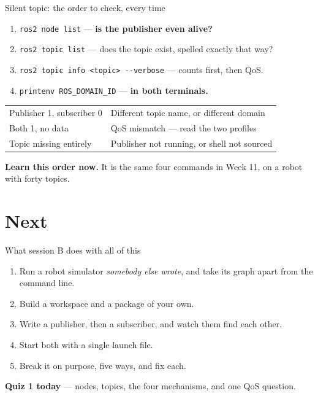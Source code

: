 \documentclass[aspectratio=169]{beamer}
\begin{document}
\begin{frame}{Silent topic: the order to check, every time}
  \small
  \begin{enumerate}
    \item \texttt{ros2 node list} --- \textbf{is the publisher even alive?}
    \item \texttt{ros2 topic list} --- does the topic exist, spelled exactly that way?
    \item \texttt{ros2 topic info <topic> -{}-verbose} --- counts first, then QoS.
    \item \texttt{printenv ROS\_DOMAIN\_ID} --- \textbf{in both terminals.}
  \end{enumerate}

  \vspace{0.7em}
  \begin{center}\footnotesize
  \begin{tabular}{@{}p{4.8cm}p{6.0cm}@{}}
    \toprule
    Publisher 1, subscriber 0 & Different topic name, or different domain \\
    Both 1, no data & QoS mismatch --- read the two profiles \\
    Topic missing entirely & Publisher not running, or shell not sourced \\
    \bottomrule
  \end{tabular}
  \end{center}

  \vspace{0.4em}
  \centering\footnotesize
  \textbf{Learn this order now.} It is the same four commands in Week 11, on a robot with
  forty topics.
\end{frame}

\section{Next}

\begin{frame}{What session B does with all of this}
  \begin{enumerate}\small
    \item Run a robot simulator \emph{somebody else wrote}, and take its graph apart from the
          command line.
    \item Build a workspace and a package of your own.
    \item Write a publisher, then a subscriber, and watch them find each other.
    \item Start both with a single launch file.
    \item Break it on purpose, five ways, and fix each.
  \end{enumerate}

  \vspace{0.8em}

  \vspace{0.5em}
  \centering\footnotesize
  \textbf{Quiz 1 today} --- nodes, topics, the four mechanisms, and one QoS question.
\end{frame}
\end{document}
